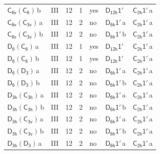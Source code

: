 \documentclass[10pt,a4paper]{article}
\numberwithin{equation}{section}
\newcommand{\grp}[1]{\mathsf{#1}}
\newcommand{\clsletter}[1]{\,{\scriptsize\color{black!55}#1}}
\begin{document}
{\begin{longtable}{@{}llrrlll@{}}
\href{C6v-C6.pdf}{$\grp{C_{6v}}(\grp{C_{6}})$}\clsletter{b} & III & 12 & 1 & yes & \href{D12h-1p.pdf}{$\grp{D_{12h}1'}$} & \href{C2h-1p.pdf}{$\grp{C_{2h}1'}$}\clsletter{a}\\
\href{C6v-C3v.pdf}{$\grp{C_{6v}}(\grp{C_{3v}})$}\clsletter{a} & III & 12 & 2 & no & \href{D6h-1p.pdf}{$\grp{D_{6h}1'}$}\clsletter{a} & \href{C2h-1p.pdf}{$\grp{C_{2h}1'}$}\clsletter{a}\\
\href{C6v-C3v.pdf}{$\grp{C_{6v}}(\grp{C_{3v}})$}\clsletter{b} & III & 12 & 2 & no & \href{D6h-1p.pdf}{$\grp{D_{6h}1'}$}\clsletter{b} & \href{C2h-1p.pdf}{$\grp{C_{2h}1'}$}\clsletter{a}\\
\href{D6-C6.pdf}{$\grp{D_{6}}(\grp{C_{6}})$}\clsletter{a} & III & 12 & 1 & yes & \href{D12h-1p.pdf}{$\grp{D_{12h}1'}$} & \href{C2h-1p.pdf}{$\grp{C_{2h}1'}$}\clsletter{a}\\
\href{D6-C6.pdf}{$\grp{D_{6}}(\grp{C_{6}})$}\clsletter{b} & III & 12 & 1 & yes & \href{D12h-1p.pdf}{$\grp{D_{12h}1'}$} & \href{C2h-1p.pdf}{$\grp{C_{2h}1'}$}\clsletter{a}\\
\href{D6-D3.pdf}{$\grp{D_{6}}(\grp{D_{3}})$}\clsletter{a} & III & 12 & 2 & no & \href{D6h-1p.pdf}{$\grp{D_{6h}1'}$}\clsletter{a} & \href{C2h-1p.pdf}{$\grp{C_{2h}1'}$}\clsletter{a}\\
\href{D6-D3.pdf}{$\grp{D_{6}}(\grp{D_{3}})$}\clsletter{b} & III & 12 & 2 & no & \href{D6h-1p.pdf}{$\grp{D_{6h}1'}$}\clsletter{b} & \href{C2h-1p.pdf}{$\grp{C_{2h}1'}$}\clsletter{a}\\
\href{D3h-C3h.pdf}{$\grp{D_{3h}}(\grp{C_{3h}})$}\clsletter{a} & III & 12 & 2 & no & \href{D6h-1p.pdf}{$\grp{D_{6h}1'}$}\clsletter{a} & \href{C2h-1p.pdf}{$\grp{C_{2h}1'}$}\clsletter{a}\\
\href{D3h-C3h.pdf}{$\grp{D_{3h}}(\grp{C_{3h}})$}\clsletter{b} & III & 12 & 2 & no & \href{D6h-1p.pdf}{$\grp{D_{6h}1'}$}\clsletter{b} & \href{C2h-1p.pdf}{$\grp{C_{2h}1'}$}\clsletter{a}\\
\href{D3h-C3v.pdf}{$\grp{D_{3h}}(\grp{C_{3v}})$}\clsletter{a} & III & 12 & 2 & no & \href{D6h-1p.pdf}{$\grp{D_{6h}1'}$}\clsletter{a} & \href{C2h-1p.pdf}{$\grp{C_{2h}1'}$}\clsletter{a}\\
\href{D3h-C3v.pdf}{$\grp{D_{3h}}(\grp{C_{3v}})$}\clsletter{b} & III & 12 & 2 & no & \href{D6h-1p.pdf}{$\grp{D_{6h}1'}$}\clsletter{b} & \href{C2h-1p.pdf}{$\grp{C_{2h}1'}$}\clsletter{a}\\
\href{D3h-D3.pdf}{$\grp{D_{3h}}(\grp{D_{3}})$}\clsletter{a} & III & 12 & 2 & no & \href{D6h-1p.pdf}{$\grp{D_{6h}1'}$}\clsletter{a} & \href{C2h-1p.pdf}{$\grp{C_{2h}1'}$}\clsletter{a}\\

\end{longtable}}
\end{document}
